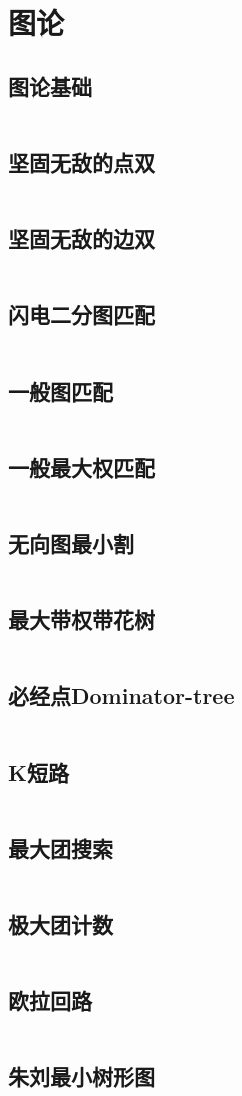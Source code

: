 \chapter{图论}
\section{图论基础}
\inputminted{cpp}{\source/graph-theory/basic.cpp}
\section{坚固无敌的点双}
\inputminted{cpp}{\source/graph-theory/biconnected-graph-vertex -jzh.cpp}
\section{坚固无敌的边双}
\inputminted{cpp}{\source/graph-theory/biconnected-graph-edge -jzh.cpp}
\section{闪电二分图匹配}
\inputminted{cpp}{\source/graph-theory/Hopcroft-Karp.cpp}
\section{一般图匹配}
\inputminted{cpp}{\source/graph-theory/general-matching.cpp}
\section{一般最大权匹配}
\inputminted{cpp}{\source/graph-theory/weighted_blossom.cpp}
\section{无向图最小割}
\inputminted{cpp}{\source/graph-theory/StoerWagner_O(V^3).cpp}
\section{最大带权带花树}
\inputminted{cpp}{\source/graph-theory/weighted_blossom.cpp}
\section{必经点Dominator-tree}
\inputminted{cpp}{\source/graph-theory/dominator.cpp}
\section{K短路}
\inputminted{cpp}{\source/graph-theory/Kth-minimum-path.cpp}
\section{最大团搜索}
\inputminted{cpp}{\source/graph-theory/最大团搜索.cpp}
\section{极大团计数}
\inputminted{cpp}{\source/graph-theory/极大团计数.cpp}
\section{欧拉回路}
\inputminted{cpp}{\source/graph-theory/euler-tour.cpp}
\section{朱刘最小树形图}
\inputminted{cpp}{\source/graph-theory/minimum_arborescence.cpp}
